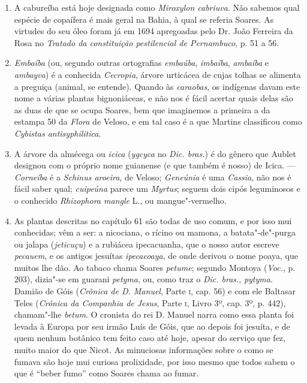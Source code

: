 \begin{enumerate}
\item A cabureíba está hoje designada como \textit{Miroxylon cabriuva}. Não sabemos qual 
espécie de copaífera é mais geral na Bahia, à qual se referia Soares. As virtudes do seu 
óleo foram já em 1694 apregoadas pelo Dr. João Ferreira da Rosa no \textit{Tratado da constituição pestilencial de Pernambuco}, p. 51 a 56.

\item \textit{Embaíba} (ou, segundo outras ortografias \textit{embaúba}, \textit{imbaíba}, \textit{ambaíba} e \textit{ambayva}) 
é a conhecida \textit{Cecropia}, árvore urticácea de cujas tolhas se alimenta a preguiça 
(animal, se entende). Quando às \textit{caraobas}, os indígenas davam este nome a várias 
plantas bignoniáceas, e não nos é fácil acertar quais delas são as duas de que se ocupa 
Soares, bem que imaginemos a primeira a da estampa 50 da \textit{Flora} de Veloso, e em tal 
caso é a que Martins classificou como \textit{Cybistas antisyphilitica}.

\item A árvore da almécega ou \textit{icica} (\textit{ygcyca} no \textit{Dic. bras.}) é do gênero que Aublet 
designou com o próprio nome guianense (e que também é nosso) de Icica. --- \textit{Corneíba} 
é a \textit{Schinus aroeira}, de Veloso; \textit{Geneúnia} é uma \textit{Cassia}, não nos é fácil saber qual; 
\textit{cuipeúna} parece um \textit{Myrtus}; seguem dois cipós leguminosos e  o  conhecido  
\textit{Rhizophora mangle} L., ou mangue"-vermelho.

\item  As plantas descritas no capítulo 61 são todas de uso comum, e por isso mui 
conhecidas; vêm a ser: a nicociana, o rícino ou mamona, a batata"-de"-purga ou jalapa 
(\textit{jeticuçu}) e a rubiácea ipecacuanha, que o nosso autor escreve \textit{pecauem}, e os antigos jesuítas  
\textit{ipecacoaya}, de onde derivou o nome poaya,  que muitos lhe dão. Ao tabaco chama Soares  \textit{petume}; segundo 
Montoya (\textit{Voc.}, p. 203), dizia"-se em guarani \textit{petyma},  ou, como traz o \textit{Dic. 
bras.}, \textit{pytyma}. Damião de Góis (\textit{Crônica de D. Manuel}, Parte \textsc{i}, cap. 56) e com ele Baltasar 
Teles (\textit{Crônica da Companhia de Jesus}, Parte \textsc{i}, Livro 3º, cap. 3º, p. 442), chamam"-lhe \textit{betum}.  
O cronista do rei D. Manuel narra como essa planta foi levada à Europa por seu 
irmão Luís de Góis, que ao depois foi jesuíta, e de quem nenhum botânico tem feito caso até 
hoje, apesar do serviço que fez, muito maior do que Nicot. As minuciosas informações sobre 
o como se fumava são hoje mui curiosa prolixidade, por isso mesmo que todos sabem o que 
é ``beber fumo'' como Soares chama ao fumar.


\end{enumerate}
